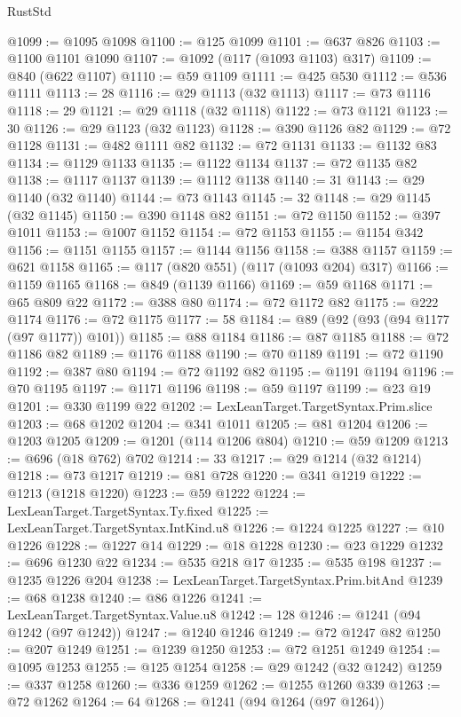 \begin{lexlean}{RustStd}
\begin{coremodule}
{\begin{coremodule}
{{{{{{{{{{{{{{{{{{{{{{{{{{{{{{{{{{{{{{{{{{{{{{{{{{{{{{{@1099 := @1095 @1098
@1100 := @125 @1099
@1101 := @637 @826
@1103 := @1100 @1101 @1090
@1107 := @1092 (@117 (@1093 @1103) @317)
@1109 := @840 (@622 @1107)
@1110 := @59 @1109
@1111 := @425 @530
@1112 := @536 @1111
@1113 := 28
@1116 := @29 @1113 (@32 @1113)
@1117 := @73 @1116
@1118 := 29
@1121 := @29 @1118 (@32 @1118)
@1122 := @73 @1121
@1123 := 30
@1126 := @29 @1123 (@32 @1123)
@1128 := @390 @1126 @82
@1129 := @72 @1128
@1131 := @482 @1111 @82
@1132 := @72 @1131
@1133 := @1132 @83
@1134 := @1129 @1133
@1135 := @1122 @1134
@1137 := @72 @1135 @82
@1138 := @1117 @1137
@1139 := @1112 @1138
@1140 := 31
@1143 := @29 @1140 (@32 @1140)
@1144 := @73 @1143
@1145 := 32
@1148 := @29 @1145 (@32 @1145)
@1150 := @390 @1148 @82
@1151 := @72 @1150
@1152 := @397 @1011
@1153 := @1007 @1152
@1154 := @72 @1153
@1155 := @1154 @342
@1156 := @1151 @1155
@1157 := @1144 @1156
@1158 := @388 @1157
@1159 := @621 @1158
@1165 := @117 (@820 @551) (@117 (@1093 @204) @317)
@1166 := @1159 @1165
@1168 := @849 (@1139 @1166)
@1169 := @59 @1168
@1171 := @65 @809 @22
@1172 := @388 @80
@1174 := @72 @1172 @82
@1175 := @222 @1174
@1176 := @72 @1175
@1177 := 58
@1184 := @89 (@92 (@93 (@94 @1177 (@97 @1177)) @101))
@1185 := @88 @1184
@1186 := @87 @1185
@1188 := @72 @1186 @82
@1189 := @1176 @1188
@1190 := @70 @1189
@1191 := @72 @1190
@1192 := @387 @80
@1194 := @72 @1192 @82
@1195 := @1191 @1194
@1196 := @70 @1195
@1197 := @1171 @1196
@1198 := @59 @1197
@1199 := @23 @19
@1201 := @330 @1199 @22
@1202 := LexLeanTarget.TargetSyntax.Prim.slice
@1203 := @68 @1202
@1204 := @341 @1011
@1205 := @81 @1204
@1206 := @1203 @1205
@1209 := @1201 (@114 @1206 @804)
@1210 := @59 @1209
@1213 := @696 (@18 @762) @702
@1214 := 33
@1217 := @29 @1214 (@32 @1214)
@1218 := @73 @1217
@1219 := @81 @728
@1220 := @341 @1219
@1222 := @1213 (@1218 @1220)
@1223 := @59 @1222
@1224 := LexLeanTarget.TargetSyntax.Ty.fixed
@1225 := LexLeanTarget.TargetSyntax.IntKind.u8
@1226 := @1224 @1225
@1227 := @10 @1226
@1228 := @1227 @14
@1229 := @18 @1228
@1230 := @23 @1229
@1232 := @696 @1230 @22
@1234 := @535 @218 @17
@1235 := @535 @198
@1237 := @1235 @1226 @204
@1238 := LexLeanTarget.TargetSyntax.Prim.bitAnd
@1239 := @68 @1238
@1240 := @86 @1226
@1241 := LexLeanTarget.TargetSyntax.Value.u8
@1242 := 128
@1246 := @1241 (@94 @1242 (@97 @1242))
@1247 := @1240 @1246
@1249 := @72 @1247 @82
@1250 := @207 @1249
@1251 := @1239 @1250
@1253 := @72 @1251 @1249
@1254 := @1095 @1253
@1255 := @125 @1254
@1258 := @29 @1242 (@32 @1242)
@1259 := @337 @1258
@1260 := @336 @1259
@1262 := @1255 @1260 @339
@1263 := @72 @1262
@1264 := 64
@1268 := @1241 (@94 @1264 (@97 @1264))
}}}}}}}}}}}}}}}}}}}}}}}}}}}}}}}}}}}}}}}}}}}}}}}}}}}}}}}
\end{coremodule}}
\end{coremodule}
\end{lexlean}
